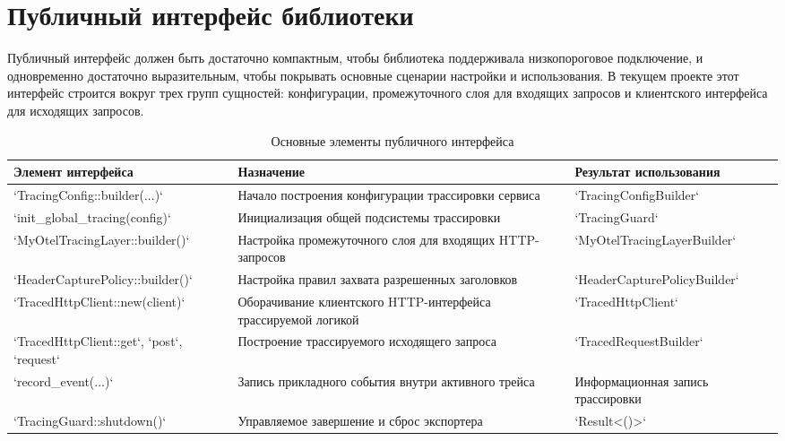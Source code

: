 \section{Публичный интерфейс библиотеки}

Публичный интерфейс должен быть достаточно компактным, чтобы библиотека
поддерживала низкопороговое подключение, и одновременно достаточно выразительным,
чтобы покрывать основные сценарии настройки и использования. В текущем проекте
этот интерфейс строится вокруг трех групп сущностей: конфигурации, промежуточного
слоя для входящих запросов и клиентского интерфейса для исходящих запросов.

\begin{table}[H]
    \centering
    \caption{Основные элементы публичного интерфейса}
    \label{tab:public-api}
    \renewcommand{\arraystretch}{1.2}
    \begin{tabularx}{\textwidth}{>{\raggedright\arraybackslash}p{4.0cm} >{\raggedright\arraybackslash}X >{\raggedright\arraybackslash}p{3.1cm}}
        \toprule
        Элемент интерфейса & Назначение & Результат использования \\
        \midrule
        `TracingConfig::builder(...)` & Начало построения конфигурации трассировки сервиса & `TracingConfigBuilder` \\
        \addlinespace
        `init_global_tracing(config)` & Инициализация общей подсистемы трассировки & `TracingGuard` \\
        \addlinespace
        `MyOtelTracingLayer::builder()` & Настройка промежуточного слоя для входящих HTTP-запросов & `MyOtelTracingLayerBuilder` \\
        \addlinespace
        `HeaderCapturePolicy::builder()` & Настройка правил захвата разрешенных заголовков & `HeaderCapturePolicyBuilder` \\
        \addlinespace
        `TracedHttpClient::new(client)` & Оборачивание клиентского HTTP-интерфейса трассируемой логикой & `TracedHttpClient` \\
        \addlinespace
        `TracedHttpClient::get`, `post`, `request` & Построение трассируемого исходящего запроса & `TracedRequestBuilder` \\
        \addlinespace
        `record_event(...)` & Запись прикладного события внутри активного трейса & Информационная запись трассировки \\
        \addlinespace
        `TracingGuard::shutdown()` & Управляемое завершение и сброс экспортера & `Result<()>` \\
        \bottomrule
    \end{tabularx}
\end{table}

